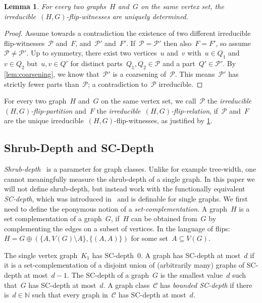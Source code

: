 \documentclass[11pt]{article}      \usepackage[margin=1in]{geometry}  \usepackage{microtype}
\newtheorem{lemma}[theorem]{Lemma}
\theoremstyle{definition}
\newcommand{\N}[0]{\mathrm{\mathbb{N}}}
\newcommand{\CC}{\mathcal{C}}
\newcommand{\PP}{\mathcal{P}}
\begin{document}
\begin{lemma}\label{lem:irreducible-unique}
    For every two graphs~$H$ and~$G$ on the same vertex set, the irreducible~$(H,G)$-flip-witnesses are uniquely determined.
\end{lemma}
\begin{proof}
    Assume towards a contradiction the existence of two different irreducible flip-witnesses~$\PP$ and~$F$, and~$\PP'$ and~$F'$.
    If~$\PP = \PP'$ then also~$F = F'$,
    so assume~$\PP \neq \PP'$.
    Up to symmetry, there exist two vertices~$u$ and~$v$ with~$u \in Q_1$ and~$v \in Q_2$ but~$u,v \in Q'$ for distinct parts~$Q_1,Q_2 \in \PP$ and a part~$Q' \in \PP'$.
    By \cref{lem:coarsening}, we know that~$\PP'$ is a coarsening of~$\PP$.
    This means~$\PP'$ has strictly fewer parts than~$\PP$; a contradiction to~$\PP$ irreducible.
\end{proof}

For every two graph~$H$ and~$G$ on the same vertex set, we call~$\PP$ the \emph{irreducible~$(H,G)$-flip-partition} and~$F$ the \emph{irreducible~$(H,G)$-flip-relation}, if~$\PP$ and~$F$ are the unique irreducible~$(H,G)$-flip-witnesses, as justified by \cref{lem:irreducible-unique}. 

\subsection{Shrub-Depth and SC-Depth}
\emph{Shrub-depth}~\cite{shrubdepth,shrubdepth-journal} is a parameter for graph classes.
Unlike for example tree-width, one cannot meaningfully measure the shrub-depth of a single graph.
In this paper we will not define shrub-depth, but instead work with the functionally equivalent \emph{SC-depth}, which was introduced in~\cite{shrubdepth} and is definable for single graphs.
We first need to define the eponymous notion of a \emph{set-complementation}.
A graph~$H$ is a set complementation of a graph~$G$, if~$H$ can be obtained from~$G$ by complementing the edges on a subset of vertices. In the language of flips:
$H = G \oplus (\{A, V(G)\setminus A\}, \{(A,A)\})$ for some set~$A\subseteq V(G)$.

The single vertex graph~$K_1$ has SC-depth~$0$.
A graph has SC-depth at most~$d$ if it is a set-complementation of a disjoint union of (arbitrarily many) graphs of SC-depth at most~$d-1$.
The SC-depth of a graph~$G$ is the smallest value~$d$ such that~$G$ has SC-depth at most~$d$.
A graph class~$\CC$ has \emph{bounded SC-depth} if there is~$d\in\N$ such that every graph in~$\CC$ has SC-depth at most~$d$.
\end{document}
